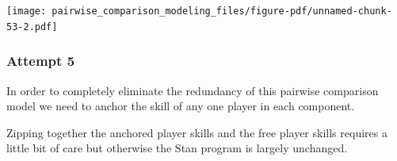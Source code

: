 \documentclass[
  letterpaper,
  DIV=11,
  numbers=noendperiod]{scrartcl}
\newenvironment{Shaded}{\begin{snugshade}}{\end{snugshade}}
\newcommand{\DecValTok}[1]{\textcolor[rgb]{0.68,0.00,0.00}{#1}}
\newcommand{\FunctionTok}[1]{\textcolor[rgb]{0.28,0.35,0.67}{#1}}
\newcommand{\NormalTok}[1]{\textcolor[rgb]{0.00,0.23,0.31}{#1}}
\newcommand{\OtherTok}[1]{\textcolor[rgb]{0.00,0.23,0.31}{#1}}
\newcommand{\SpecialCharTok}[1]{\textcolor[rgb]{0.37,0.37,0.37}{#1}}
\begin{document}
\texttt{[image: pairwise\_comparison\_modeling\_files/figure-pdf/unnamed-chunk-53-2.pdf]}

\subsubsection{Attempt 5}\label{attempt-5}

In order to completely eliminate the redundancy of this pairwise
comparison model we need to anchor the skill of any one player in each
component.

\begin{Shaded}
\end{Shaded}

Zipping together the anchored player skills and the free player skills
requires a little bit of care but otherwise the Stan program is largely
unchanged.
\end{document}
